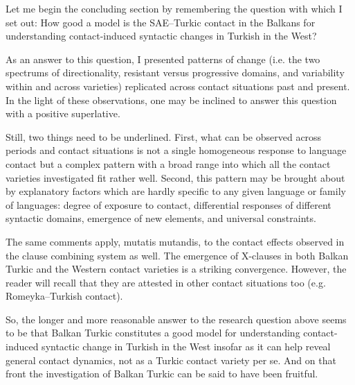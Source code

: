 \documentclass[output=paper,colorlinks,citecolor=brown]{langscibook}
\begin{document}
Let me begin the concluding section by remembering the question with which I set out: How good a model is the SAE--Turkic contact in the Balkans for understanding contact-induced syntactic changes in Turkish in the West?

As an answer to this question, I presented patterns of change (i.e. the two spectrums of directionality, resistant versus progressive domains, and variability within and across varieties) replicated across contact situations past and present. In the light of these observations, one may be inclined to answer this question with a positive superlative.

Still, two things need to be underlined. First, what can be observed across periods and contact situations is not a single homogeneous response to language contact but a complex pattern with a broad range into which all the contact varieties investigated fit rather well. Second, this pattern may be brought about by explanatory factors which are hardly specific to any given language or family of languages: degree of exposure to contact, differential responses of different syntactic domains, emergence of new elements, and universal constraints.

The same comments apply, mutatis mutandis, to the contact effects observed in the clause combining system as well. The emergence of X-clauses in both Balkan Turkic and the Western contact varieties is a striking convergence. However, the reader will recall that they are attested in other contact situations too (e.g. Romeyka--Turkish contact). 

So, the longer and more reasonable answer to the research question above seems to be that Balkan Turkic constitutes a good model for understanding contact\hyp induced syntactic change in Turkish in the West insofar as it can help reveal general contact dynamics, not as a Turkic contact variety per se. And on that front the investigation of Balkan Turkic can be said to have been fruitful.

 
\end{document}

